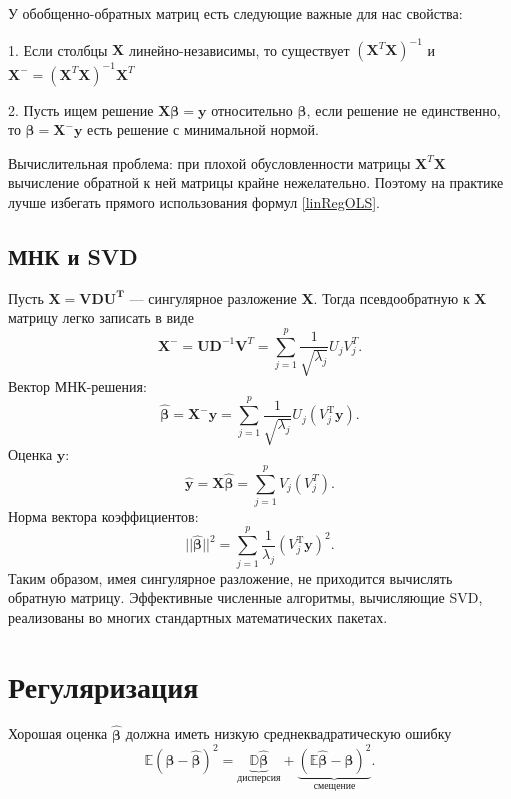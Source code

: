 \documentclass[12pt]{article}
\newcommand{\betah}{\hat{\bm \beta}}
\newcommand{\betaa}{\bm{\beta}}
\newcommand{\X}{\bm{X}}
\begin{document}
	У обобщенно-обратных матриц есть следующие важные для нас свойства:
	
	1.  Если столбцы $\X$ линейно-независимы, то существует $(\X^T \X)^{-1}$ и $\X^{-} = (\X^T \X)^{-1} \X^T$
	
	2.  Пусть ищем решение $\X \betaa = \bm y$ относительно $\betaa$, если решение не единственно, то $\betaa = \X^{-} \bm y$ есть решение с минимальной нормой.
	
	
	Вычислительная проблема:  при плохой обусловленности матрицы $\X^{T} \X$ вычисление обратной к ней матрицы крайне нежелательно. Поэтому на практике лучше избегать прямого использования формул \eqref{linRegOLS}.
	
	\subsection{МНК и SVD}
	
	Пусть $\mathbf{X}=\mathbf{V}\mathbf{D}\mathbf{U^{T}}$ --- сингулярное разложение $\mathbf{X}$.
	Тогда псевдообратную к $\mathbf{X}$ матрицу легко записать в виде
	\begin{equation*}
		\mathbf{X}^{-}
		=
		\mathbf{U}\mathbf{D}^{-1}\mathbf{V}^{T}
		=
		\sum_{j=1}^{p}
		\frac{1}{\sqrt{\lambda_{j}}}
		U_{j}V_{j}^{T}.
	\end{equation*}
	Вектор МНК-решения:
	\begin{equation}\label{eq:B_SVD}
		\betah =\mathbf{X}^{-}\bm y
		=
		\sum_{j=1}^{p}
		\frac{1}{\sqrt{\lambda_{j}}}
		U_{j}(V_{j}^{\mathrm{T}} \bm y).
	\end{equation}
	Оценка $\bm y$:
	\begin{equation}\label{eq:Y_SVD}
		\hat{\bm y}
		=
		\mathbf{X}\betah
		=
		\sum_{j=1}^{p}
		V_{j}(V_{j}^{T}).
	\end{equation}
	Норма вектора коэффициентов:
	\begin{equation}\label{eq:||B||_SVD}
		||\betah||^{2}
		=
		\sum_{j=1}^{p}
		\frac{1}{\lambda_{j}}(V_{j}^{\mathrm{T}} \bm y)^{2}.
	\end{equation}
	Таким образом, имея сингулярное разложение, не приходится вычислять обратную матрицу. Эффективные численные алгоритмы, вычисляющие SVD, реализованы
	во многих стандартных математических пакетах.
	
	\section{Регуляризация}
	
	Хорошая оценка $\betah$ должна иметь низкую среднеквадратическую ошибку 
	\begin{equation*}
		\label{eq:mse}
		\mathbb{E}(\betaa - \betah)^2 = \underbrace{\mathbb D \betah}_{\text{дисперсия}} + \underbrace{(\mathbb E \betah - \betaa)^2}_{\text{смещение}}.
	\end{equation*}
	
\end{document}
